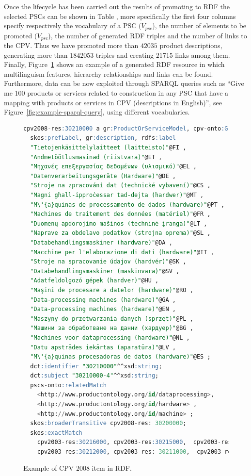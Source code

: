 Once the lifecycle has been carried out the results of promoting to RDF the selected PSCs can be shown in Table , 
more specifically the first four columns specify respectively the vocabulary of a PSC ($V_{psc}$), the number of elements 
to be promoted ($V_{psc}$), the number of generated RDF triples and the number of links to the CPV. 
Thus we have promoted more than $42035$ product descriptions, generating more than $1842053$ triples and creating $21715$ 
links among them. Finally, Figure~\ref{fig:example-cpv-code}  shows an example of a generated RDF resource in which multilinguism features, 
hierarchy relationships and links can be found. Furthermore, data can be now exploited through SPARQL queries 
such as ``Give me 100 products or services related to construction in any PSC that 
have a mapping with products or services in CPV (descriptions in English)'', see Figure~\ref{fig:example-sparql-query}, using different vocabularies.

\begin{figure}[!ht]
\begin{lstlisting}[language=SQL,basicstyle=\ttfamily\footnotesize]  
cpv2008-res:30210000 a gr:ProductOrServiceModel, cpv-onto:Group;
  skos:prefLabel, gr:description, rdfs:label 	
  "Tietojenkäsittelylaitteet (laitteisto)"@FI ,
  "Andmetöötlusmasinad (riistvara)"@ET , 
  "Μηχανές επεξεργασίας δεδομένων (υλισμικό)"@EL , 
  "Datenverarbeitungsgeräte (Hardware)"@DE , 
  "Stroje na zpracování dat (technické vybavení)"@CS ,
  "Magni għall-ipproċessar tad-dejta (ħardwer)"@MT , 
  "M\'{a}quinas de processamento de dados (hardware)"@PT , 
  "Machines de traitement des données (matériel)"@FR ,
  "Duomenų apdorojimo mašinos (techninė įranga)"@LT , 
  "Naprave za obdelavo podatkov (strojna oprema)"@SL , 
  "Databehandlingsmaskiner (hardware)"@DA ,
  "Macchine per l'elaborazione di dati (hardware)"@IT ,
  "Stroje na spracovanie údajov (hardvér)"@SK , 
  "Databehandlingsmaskiner (maskinvara)"@SV ,
  "Adatfeldolgozó gépek (hardver)"@HU ,
  "Maşini de procesare a datelor (hardware)"@RO , 
  "Data-processing machines (hardware)"@GA ,
  "Data-processing machines (hardware)"@EN ,
  "Maszyny do przetwarzania danych (sprzęt)"@PL , 
  "Машини за обработване на данни (хардуер)"@BG ,
  "Machines voor dataprocessing (hardware)"@NL , 
  "Datu apstrādes iekārtas (aparatūra)"@LV ,
  "M\'{a}quinas procesadoras de datos (hardware)"@ES ;
  dct:identifier "30210000"^^xsd:string;
  dct:subject "30210000-4"^^xsd:string;
  pscs-onto:relatedMatch   
    <http://www.productontology.org/id/dataprocessing>,
    <http://www.productontology.org/id/hardware> ,
    <http://www.productontology.org/id/machine> ;	
  skos:broaderTransitive cpv2008-res: 30200000;
  skos:exactMatch 
    cpv2003-res:30216000, cpv2003-res:30215000,  cpv2003-res:30213000,   
    cpv2003-res:30212000, cpv2003-res: 30211000,  cpv2003-res:30214000.
\end{lstlisting}
\caption{Example of CPV 2008 item in RDF.}
 \label{fig:example-cpv-code}
\end{figure}


